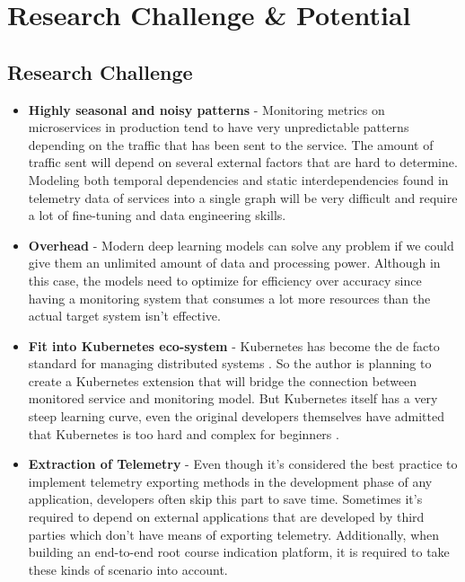 \section{Research Challenge \& Potential}


\subsection{Research Challenge}

\begin{itemize}[leftmargin=*] 
    \item \textbf{Highly seasonal and noisy patterns} - Monitoring metrics on microservices in production tend to have very unpredictable patterns depending on the traffic that has been sent to the service. The amount of traffic sent will depend on several external factors that are hard to determine. Modeling both temporal dependencies and static interdependencies found in telemetry data of services into a single graph will be very difficult and require a lot of fine-tuning and data engineering skills.
    \item \textbf{Overhead} - Modern deep learning models can solve any problem if we could give them an unlimited amount of data and processing power. Although in this case, the models need to optimize for efficiency over accuracy since having a monitoring system that consumes a lot more resources than the actual target system isn't effective.
    \item \textbf{Fit into Kubernetes eco-system} - Kubernetes has become the de facto standard for managing distributed systems \citep{WhatisCo78:online}. So the author is planning to create a Kubernetes extension that will bridge the connection between monitored service and monitoring model. But Kubernetes itself has a very steep learning curve, even the original developers themselves have admitted that Kubernetes is too hard and complex for beginners \citep{Googlead4:online}.
    \item \textbf{Extraction of Telemetry} - Even though it's considered the best practice to implement telemetry exporting methods in the development phase of any application, developers often skip this part to save time. Sometimes it's required to depend on external applications that are developed by third parties which don't have means of exporting telemetry. Additionally, when building an end-to-end root course indication platform, it is required to take these kinds of scenario into account.
\end{itemize}

